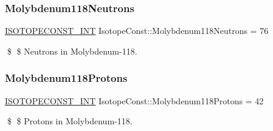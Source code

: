 \subsubsection{\texorpdfstring{Molybdenum118\+Neutrons}{Molybdenum118Neutrons}}
{\footnotesize\ttfamily \mbox{\hyperlink{group___isotope_const-_macros_ga5f18360b3e99483a35c32d789e62621c}{I\+S\+O\+T\+O\+P\+E\+C\+O\+N\+S\+T\+\_\+\+I\+NT}} Isotope\+Const\+::\+Molybdenum118\+Neutrons = 76}

\$ \$ Neutrons in Molybdenum-\/118. \mbox{\label{group___isotope_const-_molybdenum-_mo118_gad63967e2555a4f3650febcc428a137b3}} 
\subsubsection{\texorpdfstring{Molybdenum118\+Protons}{Molybdenum118Protons}}
{\footnotesize\ttfamily \mbox{\hyperlink{group___isotope_const-_macros_ga5f18360b3e99483a35c32d789e62621c}{I\+S\+O\+T\+O\+P\+E\+C\+O\+N\+S\+T\+\_\+\+I\+NT}} Isotope\+Const\+::\+Molybdenum118\+Protons = 42}

\$ \$ Protons in Molybdenum-\/118. 